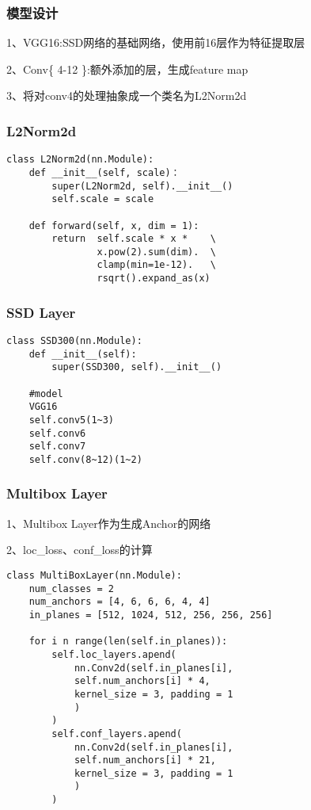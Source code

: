 \subsubsection{模型设计}
1、VGG16:SSD网络的基础网络，使用前16层作为特征提取层

2、Conv\{ 4-12 \}:额外添加的层，生成feature map

3、将对conv4的处理抽象成一个类名为L2Norm2d

\subsubsection{L2Norm2d}
\begin{lstlisting}[caption={L2Norm2d}]
class L2Norm2d(nn.Module):
	def __init__(self, scale)：
		super(L2Norm2d, self).__init__()
		self.scale = scale
		
	def forward(self, x, dim = 1):
		return  self.scale * x *    \
				x.pow(2).sum(dim).  \
				clamp(min=1e-12).	\
				rsqrt().expand_as(x)
\end{lstlisting}
\subsubsection{SSD Layer}
\begin{lstlisting}[caption={SSD layer}]
class SSD300(nn.Module):
	def __init__(self):
		super(SSD300, self).__init__()
	
	#model
	VGG16
	self.conv5(1~3)
	self.conv6
	self.conv7
	self.conv(8~12)(1~2)
\end{lstlisting}

\subsubsection{Multibox Layer}
1、Multibox Layer作为生成Anchor的网络

2、loc\_loss、conf\_loss的计算

\begin{lstlisting}[caption={Multibox layer}]
class MultiBoxLayer(nn.Module):
	num_classes = 2
	num_anchors = [4, 6, 6, 6, 4, 4]
	in_planes = [512, 1024, 512, 256, 256, 256]
	
	for i n range(len(self.in_planes)):
		self.loc_layers.apend(
			nn.Conv2d(self.in_planes[i],
			self.num_anchors[i] * 4,
			kernel_size = 3, padding = 1
			)
		)
		self.conf_layers.apend(
			nn.Conv2d(self.in_planes[i],
			self.num_anchors[i] * 21,
			kernel_size = 3, padding = 1
			)
		)
\end{lstlisting}